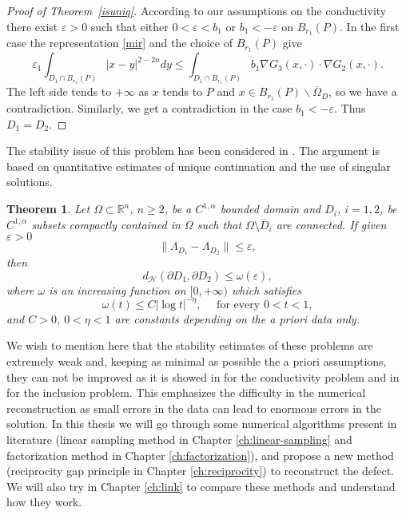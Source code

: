 \documentclass[10pt, a4paper, twoside, openright]{book}
\theoremstyle{definition}
\theoremstyle{plain}
\newtheorem{theorem}[subsection]{Theorem}
\theoremstyle{plain}
\theoremstyle{plain}
\theoremstyle{plain}
\theoremstyle{plain}
\theoremstyle{plain}
\theoremstyle{plain}
\theoremstyle{plain}
\begin{document}
\begin{proof}[Proof of Theorem~\ref{isuniq}]
According to our assumptions on the conductivity there exist $\varepsilon>0$ such that
either $0<\varepsilon<b_1$ or $b_1<-\varepsilon$ on $B_{r_1}(P)$.
In the first case the representation \eqref{mir} and the choice of
$B_{r_1}(P)$ give
$$\varepsilon_1\int_{D_1\cap B_{r_1}(P)}|x-y|^{2-2n}dy
\leq\int_{D_1\cap B_{r_1}(P)}b_1\nabla G_3(x,\cdot)\cdot\nabla G_2(x,\cdot).$$
The left side tends to $+\infty$ as $x$ tends to $P$
and $x\in B_{r_1}(P)\backslash\overline\Omega_D$, so we have a contradiction.
Similarly, we get a contradiction in the case $b_1<-\varepsilon$.
Thus $D_1=D_2$.
\end{proof}
The stability issue of this problem has been considered in \cite{Al-DC}.
The argument is based on quantitative estimates of unique continuation and the use of singular solutions.
\begin{theorem}
Let $\Omega\subset\mathbb R^n$, $n\geq2$, be a $C^{1,\alpha}$ bounded domain and
$D_i$, $i=1,2$, be $C^{1,\alpha}$ subsets compactly contained in $\Omega$ such that
$\Omega\setminus\overline D_i$ are connected. If given $\varepsilon>0$
$$\|\Lambda_{D_1}-\Lambda_{D_2}\|\leq\varepsilon,$$
then
$$d_\mathcal H(\partial D_1,\partial D_2)\leq\omega(\varepsilon),$$
where $\omega$ is an increasing function on $[0,+\infty)$ which satisfies
$$\omega(t)\leq C|\log t|^{-\eta},\quad\textrm{ for every } 0<t<1,$$
and $C>0$, $0<\eta<1$ are constants depending on the a priori data only.
\end{theorem}
We wish to mention here that the stability estimates of these problems are extremely weak
and, keeping as minimal as possible the a priori assumptions, they can not be improved as it
is showed in \cite{Ma} for the conductivity problem and in \cite{DC-Ro} for the inclusion problem.
This emphasizes the difficulty in the numerical reconstruction as small errors in the data
can lead to enormous errors in the solution.
In this thesis we will go through some numerical algorithms present in literature
(linear sampling method in Chapter \ref{ch:linear-sampling} and factorization method in Chapter \ref{ch:factorization}), 
and propose a new method (reciprocity gap principle in Chapter \ref{ch:reciprocity}) to reconstruct the defect.
We will also try in Chapter \ref{ch:link} to compare these methods and understand how they work.
\end{document}
